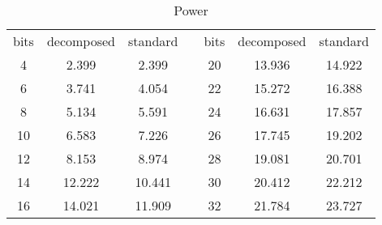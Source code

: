 \documentclass[a4paper]{article}
\begin{document}
\begin{table}%
\centering
    \caption{Power}
		\vspace{6pt}
    \begin{tabular}{ccccccc}
		\toprule
    bits	 & decomposed	 & standard && bits	 & decomposed	 & standard\\ 
    \cmidrule{1-3}\cmidrule{5-7} 
    4	 & 2.399	 & 2.399 && 20	 & 13.936	 & 14.922  \\ 
    6	 & 3.741	 & 4.054 && 22	 & 15.272	 & 16.388 \\ 
    8	 & 5.134	 & 5.591 && 24	 & 16.631	 & 17.857  \\ 
    10	 & 6.583	 & 7.226 && 26	 & 17.745	 & 19.202 \\ 
    12	 & 8.153	 & 8.974 && 28	 & 19.081	 & 20.701 \\ 
    14	 & 12.222	 & 10.441 && 30	 & 20.412	 & 22.212 \\ 
    16	 & 14.021	 & 11.909 && 32	 & 21.784	 & 23.727 \\ 
		\bottomrule
    \end{tabular}
    \label{tab:fpga_power}
\end{table}
\end{document}
